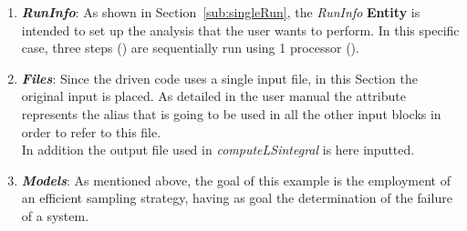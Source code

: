 \begin{enumerate}
   \item \textbf{\textit{RunInfo}}:
   As shown in Section~\ref{sub:singleRun}, the \textit{RunInfo} \textbf{Entity} is intended to set up the analysis
   that the user wants to perform. In this specific case, three steps () are  sequentially run
   using 1 processor ().
   \item \textbf{\textit{Files}}:
   Since the driven code uses a single input file, in this Section the original input is placed. As detailed in the user manual
   the attribute   represents the alias that is going to be
   used in all the other input blocks in order to refer to this file.
   \\In addition the output file used in 
   \textit{computeLSintegral} is here inputted.
   \item \textbf{\textit{Models}}:
 As mentioned above, the goal of this example is the employment of
 an efficient sampling strategy, having as goal the determination of the
 failure of a system.


\end{enumerate}
